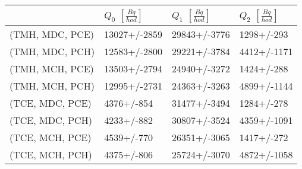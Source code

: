 \begin{tabular}{llll}
\toprule
{} & $Q_0$ $\left[\si{\frac{Bq}{hod}}\right]$ & $Q_1$ $\left[\si{\frac{Bq}{hod}}\right]$ & $Q_2$ $\left[\si{\frac{Bq}{hod}}\right]$ \\
\midrule
(TMH, MDC, PCE) &                             13027+/-2859 &                             29843+/-3776 &                               1298+/-293 \\
(TMH, MDC, PCH) &                             12583+/-2800 &                             29221+/-3784 &                              4412+/-1171 \\
(TMH, MCH, PCE) &                             13503+/-2794 &                             24940+/-3272 &                               1424+/-288 \\
(TMH, MCH, PCH) &                             12995+/-2731 &                             24363+/-3263 &                              4899+/-1144 \\
(TCE, MDC, PCE) &                               4376+/-854 &                             31477+/-3494 &                               1284+/-278 \\
(TCE, MDC, PCH) &                               4233+/-882 &                             30807+/-3524 &                              4359+/-1091 \\
(TCE, MCH, PCE) &                               4539+/-770 &                             26351+/-3065 &                               1417+/-272 \\
(TCE, MCH, PCH) &                               4375+/-806 &                             25724+/-3070 &                              4872+/-1058 \\
\bottomrule
\end{tabular}
